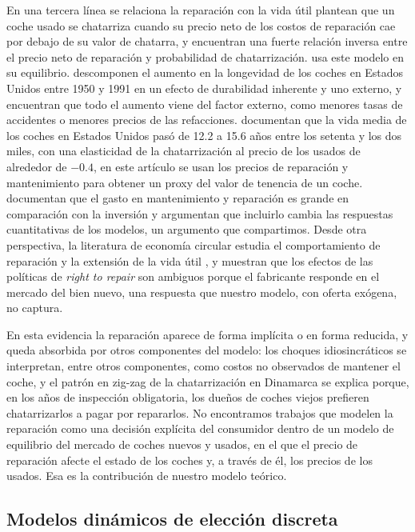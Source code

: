 \documentclass{article}
\begin{document}
En una tercera línea se relaciona la reparación con la vida útil \textcite{ManskiGoldin1983} plantean que un coche usado se chatarriza cuando su precio neto de los costos de reparación cae por debajo de su valor de chatarra, y encuentran una fuerte relación inversa entre el precio neto de reparación y probabilidad de chatarrización. \textcite{Berkovec1985} usa este modelo en su equilibrio. \textcite{HamiltonMacauley1999} descomponen el aumento en la longevidad de los coches en Estados Unidos entre 1950 y 1991 en un efecto de durabilidad inherente y uno externo, y encuentran que todo el aumento viene del factor externo, como menores tasas de accidentes o menores precios de las refacciones. \textcite{Bento2018} documentan que la vida media de los coches en Estados Unidos pasó de 12.2 a 15.6 años entre los setenta y los dos miles, con una elasticidad de la chatarrización al precio de los usados de alrededor de $-0.4$, en este artículo se usan los precios de reparación y mantenimiento para obtener un proxy del valor de tenencia de un coche. \textcite{McGrattanSchmitz1999} documentan que el gasto en mantenimiento y reparación es grande en comparación con la inversión y argumentan que incluirlo cambia las respuestas cuantitativas de los modelos, un argumento que compartimos. Desde otra perspectiva, la literatura de economía circular estudia el comportamiento de reparación y la extensión de la vida útil \parencite{Bakker2014,Parajuly2024}, y \textcite{JinYangZhu2023} muestran que los efectos de las políticas de \textit{right to repair} son ambiguos porque el fabricante responde en el mercado del bien nuevo, una respuesta que nuestro modelo, con oferta exógena, no captura.

En esta evidencia la reparación aparece de forma implícita o en forma reducida, y \textcite{Gillingham2022} queda absorbida por otros componentes del modelo: los choques idiosincráticos se interpretan, entre otros componentes, como costos no observados de mantener el coche, y el patrón en zig-zag de la chatarrización en Dinamarca se explica porque, en los años de inspección obligatoria, los dueños de coches viejos prefieren chatarrizarlos a pagar por repararlos. No encontramos trabajos que modelen la reparación como una decisión explícita del consumidor dentro de un modelo de equilibrio del mercado de coches nuevos y usados, en el que el precio de reparación afecte el estado de los coches y, a través de él, los precios de los usados. Esa es la contribución de nuestro modelo teórico.

\subsection{Modelos dinámicos de elección discreta}
\end{document}
